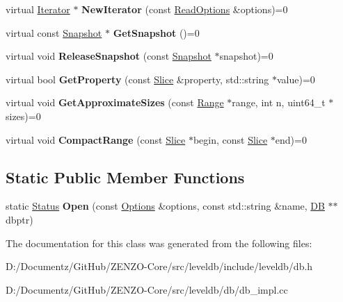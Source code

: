 \begin{DoxyCompactItemize}
\mbox{\label{classleveldb_1_1_d_b_a5629308235de24c05c286c353d4e7d32}} 
virtual \mbox{\hyperlink{classleveldb_1_1_iterator}{Iterator}} $\ast$ {\bfseries New\+Iterator} (const \mbox{\hyperlink{structleveldb_1_1_read_options}{Read\+Options}} \&options)=0
\item 
\mbox{\label{classleveldb_1_1_d_b_a7d13f6336c7c5f0bf79578d57c45568c}} 
virtual const \mbox{\hyperlink{classleveldb_1_1_snapshot}{Snapshot}} $\ast$ {\bfseries Get\+Snapshot} ()=0
\item 
\mbox{\label{classleveldb_1_1_d_b_aa46de65e990bd179db0aee770af89144}} 
virtual void {\bfseries Release\+Snapshot} (const \mbox{\hyperlink{classleveldb_1_1_snapshot}{Snapshot}} $\ast$snapshot)=0
\item 
\mbox{\label{classleveldb_1_1_d_b_afcd557d80bac6668f20372c9e737d807}} 
virtual bool {\bfseries Get\+Property} (const \mbox{\hyperlink{classleveldb_1_1_slice}{Slice}} \&property, std\+::string $\ast$value)=0
\item 
\mbox{\label{classleveldb_1_1_d_b_ad4d54aa1dbcecc8583b013ab2d67aeff}} 
virtual void {\bfseries Get\+Approximate\+Sizes} (const \mbox{\hyperlink{structleveldb_1_1_range}{Range}} $\ast$range, int n, uint64\+\_\+t $\ast$sizes)=0
\item 
\mbox{\label{classleveldb_1_1_d_b_aeea500cbc6704454b3be6908d5da8b3a}} 
virtual void {\bfseries Compact\+Range} (const \mbox{\hyperlink{classleveldb_1_1_slice}{Slice}} $\ast$begin, const \mbox{\hyperlink{classleveldb_1_1_slice}{Slice}} $\ast$end)=0
\end{DoxyCompactItemize}
\subsection*{Static Public Member Functions}
\begin{DoxyCompactItemize}
\item 
\mbox{\label{classleveldb_1_1_d_b_ac1da2b48e911287d86f3a3bfa0f851fe}} 
static \mbox{\hyperlink{classleveldb_1_1_status}{Status}} {\bfseries Open} (const \mbox{\hyperlink{structleveldb_1_1_options}{Options}} \&options, const std\+::string \&name, \mbox{\hyperlink{classleveldb_1_1_d_b}{DB}} $\ast$$\ast$dbptr)
\end{DoxyCompactItemize}


The documentation for this class was generated from the following files\+:\begin{DoxyCompactItemize}
\item 
D\+:/\+Documentz/\+Git\+Hub/\+Z\+E\+N\+Z\+O-\/\+Core/src/leveldb/include/leveldb/db.\+h\item 
D\+:/\+Documentz/\+Git\+Hub/\+Z\+E\+N\+Z\+O-\/\+Core/src/leveldb/db/db\+\_\+impl.\+cc\end{DoxyCompactItemize}
